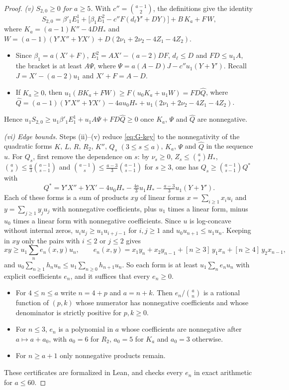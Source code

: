 \begin{proof}
\emph{(v) $S_{2,0}\geq0$ for $a\geq5$.} With $c''=\binom{a-1}2$, the definitions give the identity
\[
S_{2,0}=\beta'_1E^1_1+\bigl[\beta_1E^2_1-c''F(d_\ell Y'+DY)\bigr]+B\,K_a+F\,W,
\]
where $K_a=(a-1)K''-4DH_*$ and $W=(a-1)(Y'X''+YX')+D(2\nu_1+2\nu_2-4Z_1-4Z_2)$.
\begin{itemize}
\item Since $\beta_1=a(X'+F)$, $E^2_1=AX'-(a-2)DF$, $d_\ell\leq D$ and $FD\leq u_1A$, the bracket is at least $A\Psi$, where $\Psi=a(A-D)J-c''u_1(Y+Y')$. Recall $J=X'-(a-2)u_1$ and $X'+F=A-D$.
\item If $K_a\geq0$, then $u_1(BK_a+FW)\geq F(u_0K_a+u_1W)=FD\widehat Q$, where $\widehat Q=(a-1)(Y'X''+YX')-4au_0H_*+u_1(2\nu_1+2\nu_2-4Z_1-4Z_2)$.
\end{itemize}
Hence $u_1S_{2,0}\geq u_1\beta'_1E^1_1+u_1A\Psi+FD\widehat Q\geq0$ once $K_a$, $\Psi$ and $\widehat Q$ are nonnegative.

\emph{(vi) Edge bounds.} Steps (ii)--(v) reduce \eqref{eq:G-key} to the nonnegativity of the quadratic forms $K$, $L$, $R$, $R_2$, $K''$, $Q_s$ $(3\leq s\leq a)$, $K_a$, $\Psi$ and $\widehat Q$ in the sequence $u$. For $Q_s$, first remove the dependence on $s$: by $\nu_s\geq0$, $Z_s\leq\binom asH_*$, $\binom as\leq\frac a3\binom{a-1}{s-1}$ and $\binom{a-1}s\leq\frac{a-3}3\binom{a-1}{s-1}$ for $s\geq3$, one has $Q_s\geq\binom{a-1}{s-1}Q^*$ with
\[
Q^*=Y'X''+YX'-4u_0H_*-\tfrac{4a}3u_1H_*-\tfrac{a-3}3u_1(Y+Y').
\]
Each of these forms is a sum of products $xy$ of linear forms $x=\sum_{i\geq1}x_iu_i$ and $y=\sum_{j\geq1}y_ju_j$ with nonnegative coefficients, plus $u_1$ times a linear form, minus $u_0$ times a linear form with nonnegative coefficients. Since $u$ is log-concave without internal zeros, $u_iu_j\geq u_1u_{i+j-1}$ for $i,j\geq1$ and $u_0u_{n+1}\leq u_1u_n$. Keeping in $xy$ only the pairs with $i\leq2$ or $j\leq2$ gives
\[
xy\geq u_1\sum_ne_n(x,y)u_n,\qquad e_n(x,y)=x_1y_n+x_2y_{n-1}+[n\geq3]\,y_1x_n+[n\geq4]\,y_2x_{n-1},
\]
and $u_0\sum_{n\geq1}h_nu_n\leq u_1\sum_{n\geq0}h_{n+1}u_n$. So each form is at least $u_1\sum_ne_nu_n$ with explicit coefficients $e_n$, and it suffices that every $e_n\geq0$.
\begin{itemize}
\item For $4\leq n\leq a$ write $n=4+p$ and $a=n+k$. Then $e_n/\binom an$ is a rational function of $(p,k)$ whose numerator has nonnegative coefficients and whose denominator is strictly positive for $p,k\geq0$.
\item For $n\leq3$, $e_n$ is a polynomial in $a$ whose coefficients are nonnegative after $a\mapsto a+a_0$, with $a_0=6$ for $R_2$, $a_0=5$ for $K_a$ and $a_0=3$ otherwise.
\item For $n\geq a+1$ only nonnegative products remain.
\end{itemize}
These certificates are formalized in Lean, and  checks every $e_n$ in exact arithmetic for $a\leq60$.


\end{proof}
